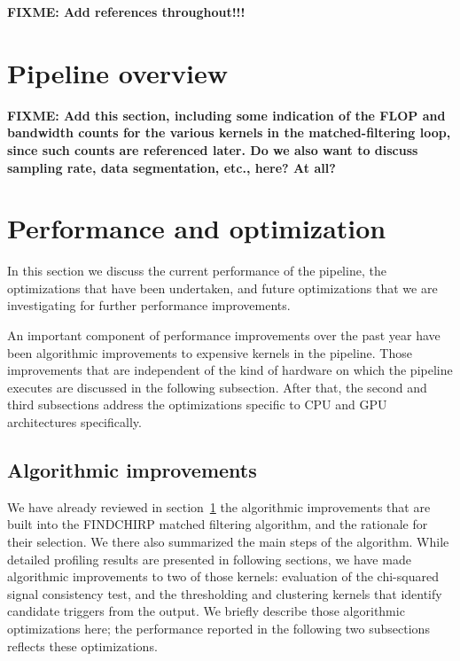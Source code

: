 \documentclass{article}
\begin{document}
\textbf{FIXME: Add references throughout!!!}

\section{Pipeline overview}
\label{sec:pipeline-overview}

\textbf{FIXME: Add this section, including some indication of the FLOP and
  bandwidth counts for the various kernels in the matched-filtering loop, since
  such counts are referenced later.  Do we also want to discuss sampling rate,
  data segmentation, etc., here?  At all?}

\section{Performance and optimization}
\label{sec:perf-optim}

In this section we discuss the current performance of the pipeline, the
optimizations that have been undertaken, and future optimizations that we are
investigating for further performance improvements.

An important component of performance improvements over the past year have been
algorithmic improvements to expensive kernels in the pipeline.  Those
improvements that are independent of the kind of hardware on which the pipeline
executes are discussed in the following subsection.  After that, the second and
third subsections address the optimizations specific to CPU and GPU
architectures specifically.

\subsection{Algorithmic improvements}
\label{sec:algor-impr}

We have already reviewed in section~\ref{sec:pipeline-overview} the algorithmic
improvements that are built into the FINDCHIRP matched filtering algorithm, and
the rationale for their selection. We there also summarized the main steps of
the algorithm.  While detailed profiling results are presented in following
sections, we have made algorithmic improvements to two of those kernels:
evaluation of the chi-squared signal consistency test, and the thresholding and
clustering kernels that identify candidate triggers from the output. We briefly
describe those algorithmic optimizations here; the performance reported in the
following two subsections reflects these optimizations.
\end{document}
